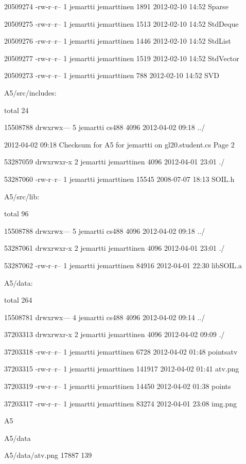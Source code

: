 \documentclass[11pt]{article}
\begin{document}
\begin{flushleft}
{20509274 -rw-r--r-- 1 jemartti jemarttinen  1891 2012-02-10 14:52 Sparse

20509275 -rw-r--r-- 1 jemartti jemarttinen  1513 2012-02-10 14:52 StdDeque

20509276 -rw-r--r-- 1 jemartti jemarttinen  1446 2012-02-10 14:52 StdList

20509277 -rw-r--r-- 1 jemartti jemarttinen  1519 2012-02-10 14:52 StdVector

20509273 -rw-r--r-- 1 jemartti jemarttinen   788 2012-02-10 14:52 SVD

A5/src/includes:

total 24

15508788 drwxrwx--- 5 jemartti cs488        4096 2012-04-02 09:18 ../

2012-04-02 09:18 Checksum for A5 for jemartti on gl20.student.cs  Page 2

53287059 drwxrwxr-x 2 jemartti jemarttinen  4096 2012-04-01 23:01 ./

53287060 -rw-r--r-- 1 jemartti jemarttinen 15545 2008-07-07 18:13 SOIL.h

A5/src/lib:

total 96

15508788 drwxrwx--- 5 jemartti cs488        4096 2012-04-02 09:18 ../

53287061 drwxrwxr-x 2 jemartti jemarttinen  4096 2012-04-01 23:01 ./

53287062 -rw-r--r-- 1 jemartti jemarttinen 84916 2012-04-01 22:30 libSOIL.a

A5/data:

total 264

15508781 drwxrwx--- 4 jemartti cs488         4096 2012-04-02 09:14 ../

37203313 drwxrwxr-x 2 jemartti jemarttinen   4096 2012-04-02 09:09 ./

37203318 -rw-r--r-- 1 jemartti jemarttinen   6728 2012-04-02 01:48 pointsatv

37203315 -rw-r--r-- 1 jemartti jemarttinen 141917 2012-04-02 01:41 atv.png

37203319 -rw-r--r-- 1 jemartti jemarttinen  14450 2012-04-02 01:38 points

37203317 -rw-r--r-- 1 jemartti jemarttinen  83274 2012-04-01 23:08 img.png

A5                                      

A5/data                                 

A5/data/atv.png                         17887   139

}
\end{flushleft}
\end{document}
